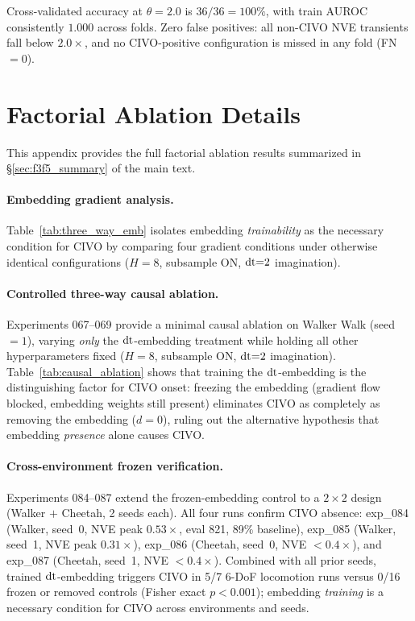 Cross-validated accuracy at $\theta{=}2.0$ is $36/36 = 100\%$, with train AUROC consistently $1.000$ across folds. Zero false positives: all non-CIVO NVE transients fall below $2.0\times$, and no CIVO-positive configuration is missed in any fold (FN${=}0$).


\section{Factorial Ablation Details}
\label{sec:appendix_factorial}

This appendix provides the full factorial ablation results summarized in \S\ref{sec:f3f5_summary} of the main text.

\paragraph{Embedding gradient analysis.}
Table~\ref{tab:three_way_emb} isolates embedding \emph{trainability} as the necessary condition for CIVO by comparing four gradient conditions under otherwise identical configurations ($H{=}8$, subsample ON, $\mathrm{dt}{=}2$ imagination).


\paragraph{Controlled three-way causal ablation.}
Experiments 067--069 provide a minimal causal ablation on Walker Walk (seed${=}1$), varying \emph{only} the $\mathrm{dt}$-embedding treatment while holding all other hyperparameters fixed ($H{=}8$, subsample ON, $\mathrm{dt}{=}2$ imagination). Table~\ref{tab:causal_ablation} shows that training the $\mathrm{dt}$-embedding is the distinguishing factor for CIVO onset: freezing the embedding (gradient flow blocked, embedding weights still present) eliminates CIVO as completely as removing the embedding ($d{=}0$), ruling out the alternative hypothesis that embedding \emph{presence} alone causes CIVO.

\paragraph{Cross-environment frozen verification.}
Experiments 084--087 extend the frozen-embedding control to a $2 \times 2$ design (Walker $+$ Cheetah, 2 seeds each). All four runs confirm CIVO absence: exp\_084 (Walker, seed~0, NVE peak $0.53\times$, eval 821, 89\% baseline), exp\_085 (Walker, seed~1, NVE peak $0.31\times$), exp\_086 (Cheetah, seed~0, NVE $< 0.4\times$), and exp\_087 (Cheetah, seed~1, NVE $< 0.4\times$). Combined with all prior seeds, trained $\mathrm{dt}$-embedding triggers CIVO in 5/7 6-DoF locomotion runs versus 0/16 frozen or removed controls (Fisher exact $p < 0.001$); embedding \emph{training} is a necessary condition for CIVO across environments and seeds.

